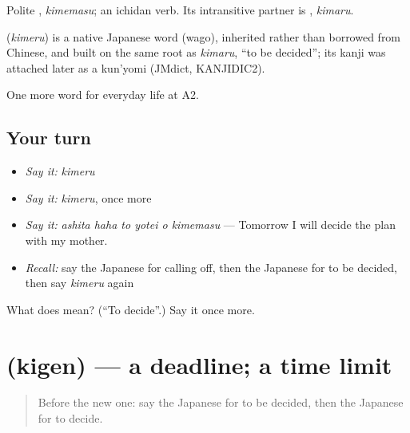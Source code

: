 Polite \textbf{}, \emph{kimemasu}; an ichidan verb. Its intransitive partner is \textbf{}, \emph{kimaru}.

\begin{cousinweb}
\textbf{} (\emph{kimeru}) is a native Japanese word (wago), inherited rather than borrowed from Chinese, and built on the same root as \emph{kimaru}, \textquotedblleft{}to be decided\textquotedblright{}; its kanji was attached later as a kun'yomi (JMdict, KANJIDIC2).
\end{cousinweb}

\begin{grammarlens}[title={What you've built}]
One more word for everyday life at A2.
\end{grammarlens}

\subsection*{Your turn}
\begin{itemize}
\raggedright
  \item \emph{Say it:} \emph{kimeru}
  \item \emph{Say it:} \emph{kimeru}, once more
  \item \emph{Say it:} \emph{ashita haha to yotei o kimemasu} — Tomorrow I will decide the plan with my mother.
  \item \emph{Recall:} say the Japanese for calling off, then the Japanese for to be decided, then say \emph{kimeru} again
\end{itemize}

\begin{tcolorbox}[breakable,colback=teal!4,colframe=teal!35!black,title={Before you move on}]
What does  mean? (\textquotedblleft{}To decide\textquotedblright{}.) Say it once more.
\end{tcolorbox}
\section[\texorpdfstring{\ja{きげん} (kigen)}{きげん (kigen)}]{ (kigen) — a deadline; a time limit}

\label{lesson:JA-C168-kigen}



\begin{quote}
Before the new one: say the Japanese for to be decided, then the Japanese for to decide.
\end{quote}

